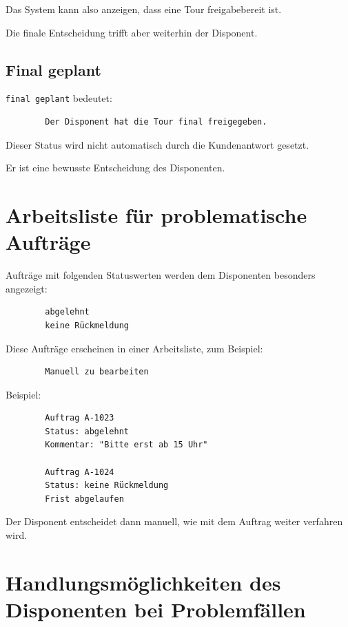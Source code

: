 \documentclass[12pt,a4paper]{article}
\begin{document}
	Das System kann also anzeigen, dass eine Tour freigabebereit ist.
	
	Die finale Entscheidung trifft aber weiterhin der Disponent.
	
	\subsection{Final geplant}
	
	\texttt{final geplant} bedeutet:
	
	\begin{lstlisting}
		Der Disponent hat die Tour final freigegeben.
	\end{lstlisting}
	
	Dieser Status wird nicht automatisch durch die Kundenantwort gesetzt.
	
	Er ist eine bewusste Entscheidung des Disponenten.
	
	\section{Arbeitsliste für problematische Aufträge}
	
	Aufträge mit folgenden Statuswerten werden dem Disponenten besonders angezeigt:
	
	\begin{lstlisting}
		abgelehnt
		keine Rückmeldung
	\end{lstlisting}
	
	Diese Aufträge erscheinen in einer Arbeitsliste, zum Beispiel:
	
	\begin{lstlisting}
		Manuell zu bearbeiten
	\end{lstlisting}
	
	Beispiel:
	
	\begin{lstlisting}
		Auftrag A-1023
		Status: abgelehnt
		Kommentar: "Bitte erst ab 15 Uhr"
		
		Auftrag A-1024
		Status: keine Rückmeldung
		Frist abgelaufen
	\end{lstlisting}
	
	Der Disponent entscheidet dann manuell, wie mit dem Auftrag weiter verfahren wird.
	
	\section{Handlungsmöglichkeiten des Disponenten bei Problemfällen}
	
\end{document}
